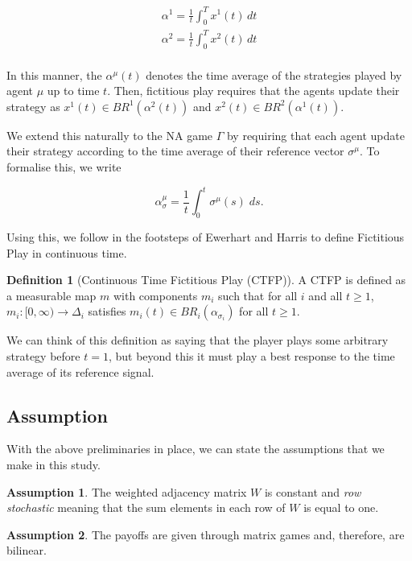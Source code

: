 \documentclass{article}
\theoremstyle{definition}
\newtheorem*{definition}{Definition}
\newtheorem{assumption}{Assumption}
\newcommand{\weightset}{W}
\newcommand{\refmu}{\sigma^{\mu}}
\newcommand{\avgref}[1]{\alpha_\sigma^{#1}}
\begin{document}
	\begin{align}
		\alpha^1 = \frac{1}{t} \int_0^T x^1(t) \, dt \\
		\alpha^2 = \frac{1}{t} \int_0^T x^2(t) \, dt \\
	\end{align}

	In this manner, the $\alpha^\mu(t)$ denotes the time average of the strategies played by agent
	$\mu$ up to time $t$. Then, fictitious play requires that the agents update their strategy as
	$x^1(t) \in BR^1(\alpha^2(t))$ and $x^2(t) \in
	BR^2(\alpha^1(t))$. 

	We extend this naturally to the NA game $\Gamma$ by requiring that each agent update their
	strategy according to the time average of their reference vector $\refmu$. To formalise this, we
	write

	\begin{equation}
		\avgref{\mu} = \frac{1}{t} \int_0^t \refmu(s) \; ds.
	\end{equation}

	Using this, we follow in the footsteps of Ewerhart \cite{} and Harris \cite{} to define
	Fictitious Play in continuous time.

	\begin{definition}[Continuous Time Fictitious Play (CTFP)]
		A CTFP is defined as a measurable map $m$ with components $m_i$ such that for all $i$ and all $t \geq 1$, $m_i: [0, \infty) \rightarrow \Delta_i$ satisfies $m_i(t) \in BR_i(\alpha_{\sigma_i})$ for all $t \geq 1$.

		We can think of this definition as saying that the player plays some arbitrary strategy before $t = 1$, but beyond this it must play a best response to the time average of its reference signal.
	\end{definition}

	\subsection{Assumption}

	With the above preliminaries in place, we can state the assumptions that we make in this study.

	\begin{assumption}
		The weighted adjacency matrix $\weightset$ is constant and \emph{row stochastic} meaning
		that the sum elements in each row of $\weightset$ is equal to one.
	\end{assumption}

	\begin{assumption}
		The payoffs are given through matrix games and, therefore, are bilinear.
	\end{assumption}
\end{document}
